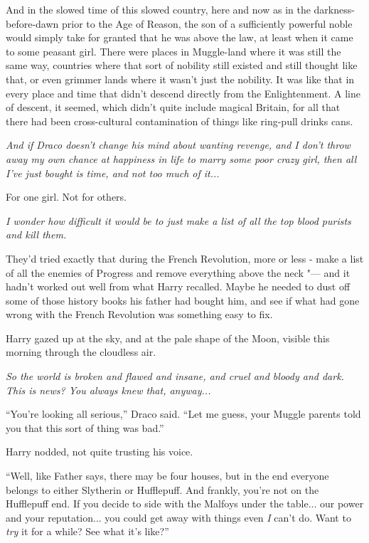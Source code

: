 And in the slowed time of this slowed country, here and now as in the
darkness-before-dawn prior to the Age of Reason, the son of a
sufficiently powerful noble would simply take for granted that he was
above the law, at least when it came to some peasant girl. There were
places in Muggle-land where it was still the same way, countries where
that sort of nobility still existed and still thought like that, or even
grimmer lands where it wasn't just the nobility. It was like that in
every place and time that didn't descend directly from the
Enlightenment. A line of descent, it seemed, which didn't quite include
magical Britain, for all that there had been cross-cultural
contamination of things like ring-pull drinks cans.

\emph{And if Draco doesn't change his mind about wanting revenge, and I
don't throw away my own chance at happiness in life to marry some poor
crazy girl, then all I've just bought is time, and not too much of
it...}

For one girl. Not for others.

\emph{I wonder how difficult it would be to just make a list of all the
top blood purists and kill them.}

They'd tried exactly that during the French Revolution, more or less -
make a list of all the enemies of Progress and remove everything above
the neck "--- and it hadn't worked out well from what Harry recalled. Maybe
he needed to dust off some of those history books his father had bought
him, and see if what had gone wrong with the French Revolution was
something easy to fix.

Harry gazed up at the sky, and at the pale shape of the Moon, visible
this morning through the cloudless air.

\emph{So the world is broken and flawed and insane, and cruel and bloody
and dark. This is news? You always knew that, anyway...}

``You're looking all serious,'' Draco said. ``Let me guess, your Muggle
parents told you that this sort of thing was bad.''

Harry nodded, not quite trusting his voice.

``Well, like Father says, there may be four houses, but in the end
everyone belongs to either Slytherin or Hufflepuff. And frankly, you're
not on the Hufflepuff end. If you decide to side with the Malfoys under
the table... our power and your reputation... you could get
away with things even \emph{I} can't do. Want to \emph{try} it for a
while? See what it's like?''

